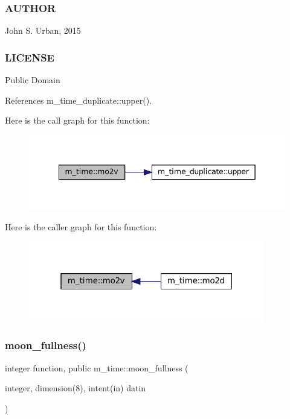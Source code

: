 \subsubsection*{A\+U\+T\+H\+OR}

John S. Urban, 2015 \subsubsection*{L\+I\+C\+E\+N\+SE}

Public Domain 

References m\+\_\+time\+\_\+duplicate\+::upper().

Here is the call graph for this function\+:\nopagebreak
\begin{figure}[H]
\begin{center}
\leavevmode
\includegraphics[width=342pt]{namespacem__time_ad7bf0886754757e8961e562f06cf3bb7_cgraph}
\end{center}
\end{figure}
Here is the caller graph for this function\+:\nopagebreak
\begin{figure}[H]
\begin{center}
\leavevmode
\includegraphics[width=292pt]{namespacem__time_ad7bf0886754757e8961e562f06cf3bb7_icgraph}
\end{center}
\end{figure}
\mbox{\label{namespacem__time_a702b39998a769b8f60070c0bec975ee2}} 
\subsubsection{\texorpdfstring{moon\+\_\+fullness()}{moon\_fullness()}}
{\footnotesize\ttfamily integer function, public m\+\_\+time\+::moon\+\_\+fullness (\begin{DoxyParamCaption}\item[{integer, dimension(8), intent(in)}]{datin }\end{DoxyParamCaption})}



